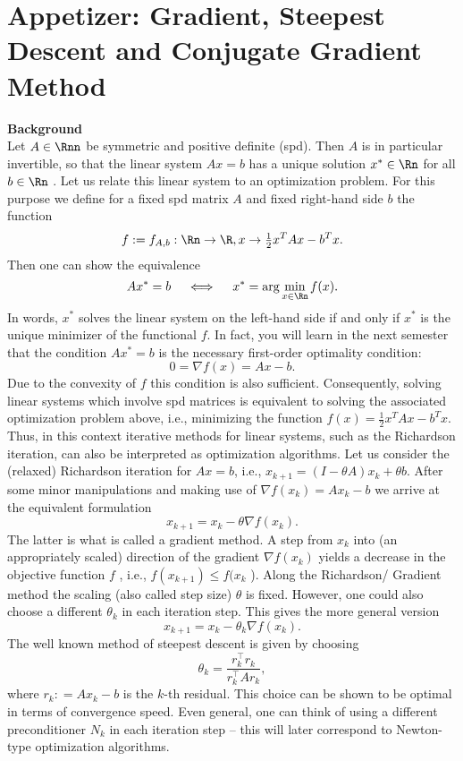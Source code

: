 \section{Appetizer: Gradient, Steepest Descent and Conjugate Gradient Method}
{\color{navy} \textbf{Background}\\
	Let $A \in \Rnn$ be symmetric and positive definite (spd). Then $A$ is in particular invertible, so that the
	linear system
	$Ax = b$
	has a unique solution $x^* \in \Rn$  for all $b \in \Rn$  . Let us relate this linear system to an optimization problem.
	For this purpose we define for a fixed spd matrix $A$ and fixed right-hand side $b$ the function
	$$f:=f_{A,b} : \Rn  \to \R, x  \to \tfrac{1}{2} x^T Ax - b^T x.$$
	Then one can show the equivalence
	$$Ax^* = b ~~~\iff~~~	x^* = \arg \min_{x\in\Rn} f (x).	$$
	In words, $x^*$ solves the linear system on the left-hand side if and only if $x^*$ is the unique minimizer of the
	functional $f$. In fact, you will learn in the next semester that the condition $Ax^* = b$ is the necessary first-order optimality
	condition:
	$$0 = \nabla f (x) = Ax - b.$$
	Due to the convexity of $f$ this condition is also sufficient.
	Consequently, solving linear systems which involve spd matrices is equivalent to solving the associated
	optimization problem above, i.e., minimizing the function $f (x) = \tfrac{1}{2} x^T Ax - b^T x$. Thus, in this context iterative methods
	for linear systems, such as the Richardson iteration, can also be interpreted as optimization algorithms.
	Let us consider the (relaxed) Richardson iteration for $Ax = b$, i.e.,
	$x_{k+1} = (I - \theta A)x_{k} + \theta b$.
	After some minor manipulations and making use of $\nabla f (x_{k} ) = Ax_{k} - b$ we arrive at the equivalent
	formulation
    $$x_{k+1} = x_{k} - \theta\nabla f (x_{k} ).$$
	The latter is what is called a gradient method. A step from $x_{k}$ into (an appropriately scaled) direction of the gradient
	$\nabla f (x_{k} )$ yields a decrease in the objective function $f$ , i.e., $f (x_{k+1} ) \leq  f (x_{k}$ ). Along the Richardson/
	Gradient method the scaling (also called step size) $\theta$ is fixed. However, one could also choose a different
	$\theta_k$  in each iteration step. This gives the more general version
\begin{equation}\label{steepest_descent_method}
	x_{k+1} = x_{k} - \theta_k  \nabla f (x_{k} ).
\end{equation}
	The well known method of steepest descent is given by choosing
\begin{equation} \label{steepest_descent_stepsize}
	\theta_k  = \frac{r_k^\top r_k}{ r_k^\top   Ar_k  },
\end{equation}
where $r_k : = Ax_{k} - b$ is the $k$-th residual. This choice can be shown to be optimal in terms of convergence
	speed. Even general, one can think of using a different preconditioner $N_k$ in each iteration step -- this will later correspond to Newton-type optimization algorithms.
}
